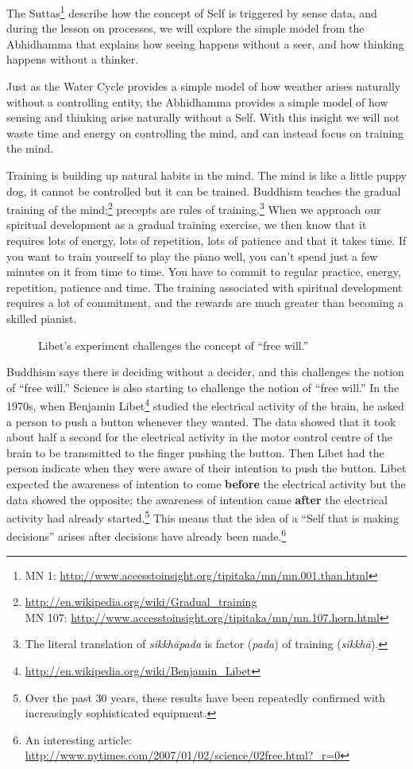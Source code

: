 The Suttas\footnote{MN 1: \url{http://www.accesstoinsight.org/tipitaka/mn/mn.001.than.html}} describe how the concept of Self is triggered by sense data, and during the lesson on processes, we will explore the simple model from the Abhidhamma that explains how seeing happens without a seer, and how thinking happens without a thinker.

Just as the Water Cycle provides a simple model of how weather arises naturally without a controlling entity, the Abhidhamma provides a simple model of how sensing and thinking arise naturally without a Self. With this insight we will not waste time and energy on controlling the mind, and can instead focus on training the mind.

Training is building up natural habits in the mind. The mind is like a little puppy dog, it cannot be controlled but it can be trained. Buddhism teaches the gradual training of the mind;\footnote{\url{http://en.wikipedia.org/wiki/Gradual_training}\\MN 107: \url{http://www.accesstoinsight.org/tipitaka/mn/mn.107.horn.html}} precepts are rules of training.\footnote{The literal translation of \textit{sikkhāpada} is factor (\textit{pada}) of training (\textit{sikkhā}).} When we approach our spiritual development as a gradual training exercise, we then know that it requires lots of energy, lots of repetition, lots of patience and that it takes time. If you want to train yourself to play the piano well, you can’t spend just a few minutes on it from time to time. You have to commit to regular practice, energy, repetition, patience and time. The training associated with spiritual development requires a lot of commitment, and the rewards are much greater than becoming a skilled pianist.

\begin{figure}[H]
\centering

\caption{Libet’s experiment challenges the concept of “free will.”}
\label{fig:Libet}
\end{figure}

Buddhism says there is deciding without a decider, and this challenges the notion of “free will.” Science is also starting to challenge the notion of “free will.” In the 1970s, when Benjamin Libet\footnote{\url{http://en.wikipedia.org/wiki/Benjamin_Libet}} studied the electrical activity of the brain, he asked a person to push a button whenever they wanted. The data showed that it took about half a second for the electrical activity in the motor control centre of the brain to be transmitted to the finger pushing the button. Then Libet had the person indicate when they were aware of their intention to push the button. Libet expected the awareness of intention to come \textbf{before} the electrical activity but the data showed the opposite; the awareness of intention came \textbf{after} the electrical activity had already started.\footnote{Over the past 30 years, these results have been repeatedly confirmed with increasingly sophisticated equipment.} This means that the idea of a “Self that is making decisions” arises after decisions have already been made.\footnote{An interesting article: \url{http://www.nytimes.com/2007/01/02/science/02free.html?_r=0}}

